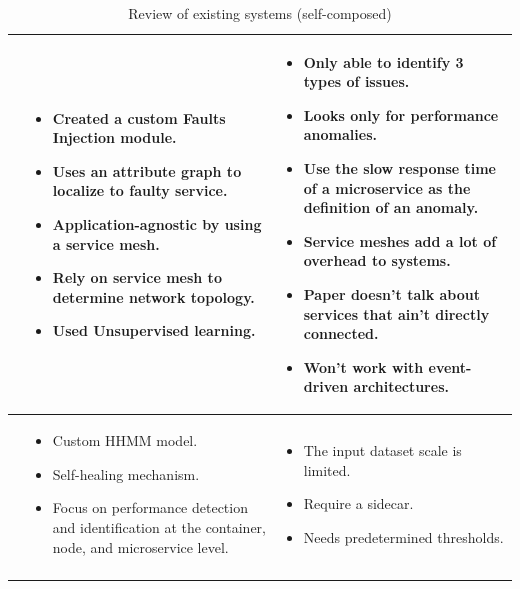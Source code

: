 \begin{longtable}{| p{25mm} | p{62mm} | p{62mm} |}
    \cite{wu2020microrca} &
    \vspace{-8mm}
    \begin{itemize}[leftmargin=3mm,noitemsep,nolistsep] 
        \item Created a custom Faults Injection module.
        \item Uses an attribute graph to localize to faulty service.
        \item Application-agnostic by using a service mesh.
        \item Rely on service mesh to determine network topology.
        \item Used Unsupervised learning.
        \vspace{-7mm}
    \end{itemize} &
    \vspace{-8mm}
    \begin{itemize}[leftmargin=3mm,noitemsep,nolistsep] 
        \item Only able to identify 3 types of issues.
        \item Looks only for performance anomalies.
        \item Use the slow response time of a microservice as the definition of an anomaly.
        \item Service meshes add a lot of overhead to systems.
        \item Paper doesn't talk about services that ain't directly connected.
        \item Won't work with event-driven architectures.
        \vspace{-7mm}
    \end{itemize} \\ \hline

    \cite{samir2019dla} &
    \vspace{-8mm}
    \begin{itemize}[leftmargin=3mm,noitemsep,nolistsep] 
        \item Custom HHMM model.
        \item Self-healing mechanism.
        \item Focus on performance detection and identification at the container, node, and microservice level.
        \vspace{-7mm}
    \end{itemize} &
    \vspace{-8mm}
    \begin{itemize}[leftmargin=3mm,noitemsep,nolistsep] 
        \item The input dataset scale is limited.
        \item Require a sidecar.
        \item Needs predetermined thresholds.
        \vspace{-7mm}
    \end{itemize} \\ \hline
    
    \caption{Review of existing systems (self-composed)}
\end{longtable}


